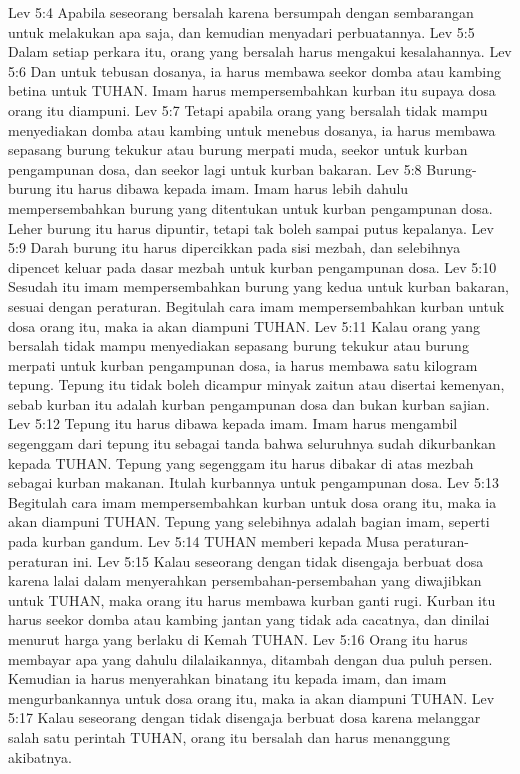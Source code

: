 Lev 5:4  Apabila seseorang bersalah karena bersumpah dengan sembarangan untuk melakukan apa saja, dan kemudian menyadari perbuatannya.
Lev 5:5  Dalam setiap perkara itu, orang yang bersalah harus mengakui kesalahannya.
Lev 5:6  Dan untuk tebusan dosanya, ia harus membawa seekor domba atau kambing betina untuk TUHAN. Imam harus mempersembahkan kurban itu supaya dosa orang itu diampuni.
Lev 5:7  Tetapi apabila orang yang bersalah tidak mampu menyediakan domba atau kambing untuk menebus dosanya, ia harus membawa sepasang burung tekukur atau burung merpati muda, seekor untuk kurban pengampunan dosa, dan seekor lagi untuk kurban bakaran.
Lev 5:8  Burung-burung itu harus dibawa kepada imam. Imam harus lebih dahulu mempersembahkan burung yang ditentukan untuk kurban pengampunan dosa. Leher burung itu harus dipuntir, tetapi tak boleh sampai putus kepalanya.
Lev 5:9  Darah burung itu harus dipercikkan pada sisi mezbah, dan selebihnya dipencet keluar pada dasar mezbah untuk kurban pengampunan dosa.
Lev 5:10  Sesudah itu imam mempersembahkan burung yang kedua untuk kurban bakaran, sesuai dengan peraturan. Begitulah cara imam mempersembahkan kurban untuk dosa orang itu, maka ia akan diampuni TUHAN.
Lev 5:11  Kalau orang yang bersalah tidak mampu menyediakan sepasang burung tekukur atau burung merpati untuk kurban pengampunan dosa, ia harus membawa satu kilogram tepung. Tepung itu tidak boleh dicampur minyak zaitun atau disertai kemenyan, sebab kurban itu adalah kurban pengampunan dosa dan bukan kurban sajian.
Lev 5:12  Tepung itu harus dibawa kepada imam. Imam harus mengambil segenggam dari tepung itu sebagai tanda bahwa seluruhnya sudah dikurbankan kepada TUHAN. Tepung yang segenggam itu harus dibakar di atas mezbah sebagai kurban makanan. Itulah kurbannya untuk pengampunan dosa.
Lev 5:13  Begitulah cara imam mempersembahkan kurban untuk dosa orang itu, maka ia akan diampuni TUHAN. Tepung yang selebihnya adalah bagian imam, seperti pada kurban gandum.
Lev 5:14  TUHAN memberi kepada Musa peraturan-peraturan ini.
Lev 5:15  Kalau seseorang dengan tidak disengaja berbuat dosa karena lalai dalam menyerahkan persembahan-persembahan yang diwajibkan untuk TUHAN, maka orang itu harus membawa kurban ganti rugi. Kurban itu harus seekor domba atau kambing jantan yang tidak ada cacatnya, dan dinilai menurut harga yang berlaku di Kemah TUHAN.
Lev 5:16  Orang itu harus membayar apa yang dahulu dilalaikannya, ditambah dengan dua puluh persen. Kemudian ia harus menyerahkan binatang itu kepada imam, dan imam mengurbankannya untuk dosa orang itu, maka ia akan diampuni TUHAN.
Lev 5:17  Kalau seseorang dengan tidak disengaja berbuat dosa karena melanggar salah satu perintah TUHAN, orang itu bersalah dan harus menanggung akibatnya.
